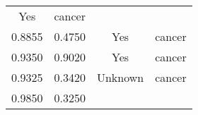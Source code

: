 \documentclass[12pt,]{article}
\begin{document}
\begin{longtable}[]{@{}cccc@{}}
\begin{minipage}[t]{0.22\columnwidth}
Yes\strut
\end{minipage} & \begin{minipage}[t]{0.16\columnwidth}\centering\strut
cancer\strut
\end{minipage}\tabularnewline
\begin{minipage}[t]{0.24\columnwidth}\centering\strut
0.8855\strut
\end{minipage} & \begin{minipage}[t]{0.26\columnwidth}\centering\strut
0.4750\strut
\end{minipage} & \begin{minipage}[t]{0.22\columnwidth}\centering\strut
Yes\strut
\end{minipage} & \begin{minipage}[t]{0.16\columnwidth}\centering\strut
cancer\strut
\end{minipage}\tabularnewline
\begin{minipage}[t]{0.24\columnwidth}\centering\strut
0.9350\strut
\end{minipage} & \begin{minipage}[t]{0.26\columnwidth}\centering\strut
0.9020\strut
\end{minipage} & \begin{minipage}[t]{0.22\columnwidth}\centering\strut
Yes\strut
\end{minipage} & \begin{minipage}[t]{0.16\columnwidth}\centering\strut
cancer\strut
\end{minipage}\tabularnewline
\begin{minipage}[t]{0.24\columnwidth}\centering\strut
0.9325\strut
\end{minipage} & \begin{minipage}[t]{0.26\columnwidth}\centering\strut
0.3420\strut
\end{minipage} & \begin{minipage}[t]{0.22\columnwidth}\centering\strut
Unknown\strut
\end{minipage} & \begin{minipage}[t]{0.16\columnwidth}\centering\strut
cancer\strut
\end{minipage}\tabularnewline
\begin{minipage}[t]{0.24\columnwidth}\centering\strut
0.9850\strut
\end{minipage} & \begin{minipage}[t]{0.26\columnwidth}\centering\strut
0.3250\strut
\end{minipage} & \begin{minipage}[t]{0.22\columnwidth}\centering\strut

\end{minipage}
\end{longtable}
\end{document}
